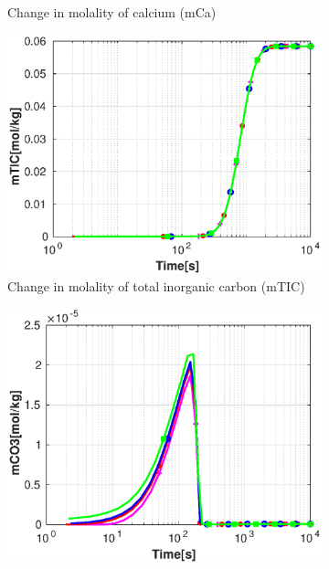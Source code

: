 \begin{figure}[!h]
\begin{subfigure}{.5\linewidth}
        \caption{\small Change in molality of calcium (mCa)}
        \label{fig:pHmCa}
    \end{subfigure}%
    \hfill
    \begin{subfigure}{.5\linewidth}
            \centering
        \includegraphics[width=\textwidth]{PICTURES/with_pH_mTIC.eps}
        \caption{\small Change in molality of total inorganic carbon (mTIC)}
        \label{fig:pHmTIC}
    \end{subfigure}%
    \hfill
    \begin{subfigure}{.5\linewidth}
            \centering
        \includegraphics[width=\textwidth]{PICTURES/with_pH_mCO3.eps}

\end{subfigure}
\end{figure}
